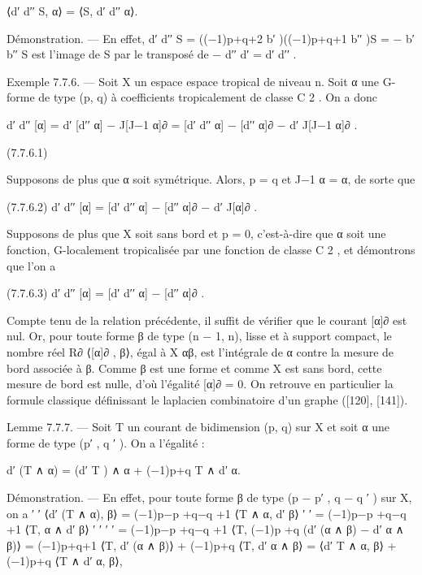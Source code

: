 \documentclass[
  10pt,
]{article}
\newenvironment{Shaded}{}{}
\newcommand{\NormalTok}[1]{#1}
\begin{document}
\begin{Shaded}
\begin{Highlighting}[]
\NormalTok{                                   ⟨d′ d′′ S, α⟩ = ⟨S, d′ d′′ α⟩.}

\NormalTok{Démonstration. — En effet, d′ d′′ S = ((−1)p+q+2 b′ )((−1)p+q+1 b′′ )S = − b′ b′′ S est}
\NormalTok{l’image de S par le transposé de − d′′ d′ = d′ d′′ .}


\NormalTok{Exemple 7.7.6. — Soit X un espace espace tropical de niveau n. Soit α une G{-}forme}
\NormalTok{de type (p, q) à coefficients tropicalement de classe C 2 . On a donc}

\NormalTok{                d′ d′′ [α] = d′ [d′′ α] − J[J−1 α]∂ = [d′ d′′ α] − [d′′ α]∂ − d′ J[J−1 α]∂ .}
                                                   
\NormalTok{(7.7.6.1)}

\NormalTok{  Supposons de plus que α soit symétrique. Alors, p = q et J−1 α = α, de sorte que}

\NormalTok{(7.7.6.2)                  d′ d′′ [α] = [d′ d′′ α] − [d′′ α]∂ − d′ J[α]∂ .}

\NormalTok{  Supposons de plus que X soit sans bord et p = 0, c’est{-}à{-}dire que α soit une fonction,}
\NormalTok{G{-}localement tropicalisée par une fonction de classe C 2 , et démontrons que l’on a}

\NormalTok{(7.7.6.3)                        d′ d′′ [α] = [d′ d′′ α] − [d′′ α]∂ .}

\NormalTok{Compte tenu de la relation précédente, il suffit de vérifier que le courant [α]∂ est nul.}
\NormalTok{Or, pour toute forme β de type (n − 1, n), lisse et à support compact, le nombre réel}
\NormalTok{                  R∂}
\NormalTok{⟨[α]∂ , β⟩, égal à X αβ, est l’intégrale de α contre la mesure de bord associée à β. Comme}
\NormalTok{β est une forme et comme X est sans bord, cette mesure de bord est nulle, d’où l’égalité}
\NormalTok{[α]∂ = 0.}
\NormalTok{   On retrouve en particulier la formule classique définissant le laplacien combinatoire}
\NormalTok{d’un graphe ([120], [141]).}

\NormalTok{Lemme 7.7.7. — Soit T un courant de bidimension (p, q) sur X et soit α une forme}
\NormalTok{de type (p′ , q ′ ). On a l’égalité :}

\NormalTok{                         d′ (T ∧ α) = (d′ T ) ∧ α + (−1)p+q T ∧ d′ α.}

\NormalTok{Démonstration. — En effet, pour toute forme β de type (p − p′ , q − q ′ ) sur X, on a}
\NormalTok{                                       ′     ′}
\NormalTok{            ⟨d′ (T ∧ α), β⟩ = (−1)p−p +q−q +1 ⟨T ∧ α, d′ β⟩}
\NormalTok{                                       ′     ′}
\NormalTok{                           = (−1)p−p +q−q +1 ⟨T, α ∧ d′ β⟩}
\NormalTok{                                       ′     ′               ′   ′}
\NormalTok{                           = (−1)p−p +q−q +1 ⟨T, (−1)p +q (d′ (α ∧ β) − d′ α ∧ β)⟩}
\NormalTok{                           = (−1)p+q+1 ⟨T, d′ (α ∧ β)⟩ + (−1)p+q ⟨T, d′ α ∧ β⟩}
\NormalTok{                           = ⟨d′ T ∧ α, β⟩ + (−1)p+q ⟨T ∧ d′ α, β⟩,}


\end{Highlighting}
\end{Shaded}
\end{document}
